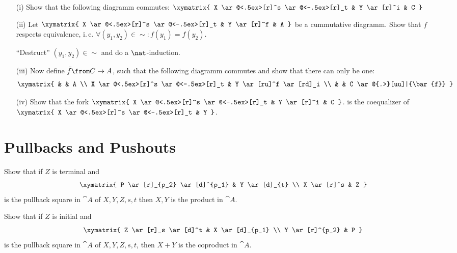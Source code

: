 \begin{exercise}
\begin{itemize}
      \begin{itemize}
        \item[(i)]Show that the following diagramm commutes:
          $\xymatrix{
            X \ar@<.5ex>[r]^s \ar@<-.5ex>[r]_t & Y \ar[r]^i & C
          }$
        \item[(ii)]Let
          $\xymatrix{
            X \ar@<.5ex>[r]^s \ar@<-.5ex>[r]_t & Y \ar[r]^f & A
          }$
          be a cummutative diagramm. Show that $f$ respects equivalence, i.\,e. $\forall (y_1, y_2) \in \sim: f(y_1) = f(y_2)$.
          \begin{hint}
            ``Destruct'' $(y_1, y_2) \in \sim$ and do a $\nat$-induction.
          \end{hint}
        \item[(iii)]Now define $\bar{f} \from C \to A$, such that the following diagramm commutes and show that there can only be one:
          \[ \xymatrix{
            & & A  \\
            X \ar@<.5ex>[r]^s \ar@<-.5ex>[r]_t & Y \ar[ru]^f \ar[rd]_i \\
            & & C \ar@{.>}[uu]|{\bar{f}}
          } \]
        \item[(iv)]Show that the fork
          $\xymatrix{
            X \ar@<.5ex>[r]^s \ar@<-.5ex>[r]_t & Y \ar[r]^i & C
          }$.
          is the coequalizer of
          $\xymatrix{
            X \ar@<.5ex>[r]^s \ar@<-.5ex>[r]_t & Y
          }$.
      \end{itemize}
  \end{itemize}
\end{exercise}

\section{Pullbacks and Pushouts}

\begin{exercise}
  Show that if $Z$ is terminal and
  \[ \xymatrix{
    P \ar[r]_{p_2} \ar[d]^{p_1} & Y \ar[d]_{t} \\
    X \ar[r]^s & Z
  } \]
  is the pullback square in $\cat{A}$ of $X, Y, Z, s, t$ then $X, Y$ is the product in $\cat{A}$.
\end{exercise}

\begin{exercise}
  Show that if $Z$ is initial and
  \[ \xymatrix{
    Z \ar[r]_s \ar[d]^t & X \ar[d]_{p_1} \\
    Y \ar[r]^{p_2} & P
  } \]
  is the pullback square in $\cat{A}$ of $X, Y, Z, s, t$, then $X + Y$ is the coproduct in $\cat{A}$.
\end{exercise}



